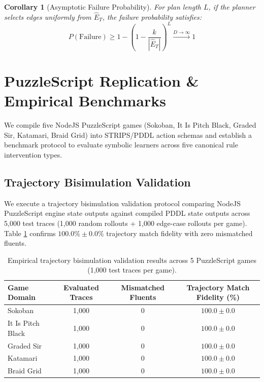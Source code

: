 \documentclass[preprint,12pt,3p]{elsarticle}
\newtheorem{corollary}{Corollary}
\begin{document}
\begin{corollary}[Asymptotic Failure Probability]
For plan length $L$, if the planner selects edges uniformly from $\hat{E}_T$, the failure probability satisfies:
\begin{equation}
P(\text{Failure}) \ge 1 - \left(1 - \frac{k}{|\hat{E}_T|}\right)^L \xrightarrow{D \to \infty} 1
\end{equation}
\end{corollary}

\section{PuzzleScript Replication \& Empirical Benchmarks}

We compile five NodeJS PuzzleScript games (Sokoban, It Is Pitch Black, Graded Sir, Katamari, Braid Grid) into STRIPS/PDDL action schemas and establish a benchmark protocol to evaluate symbolic learners across five canonical rule intervention types.

\subsection{Trajectory Bisimulation Validation}
We execute a trajectory bisimulation validation protocol comparing NodeJS PuzzleScript engine state outputs against compiled PDDL state outputs across 5,000 test traces (1,000 random rollouts + 1,000 edge-case rollouts per game). Table \ref{tab:bisimulation} confirms $100.0\% \pm 0.0\%$ trajectory match fidelity with zero mismatched fluents.

\begin{table}[htbp]
\centering
\caption{Empirical trajectory bisimulation validation results across 5 PuzzleScript games (1,000 test traces per game).}
\label{tab:bisimulation}
\small
\begin{tabular}{lccc}
\toprule
\textbf{Game Domain} & \textbf{Evaluated Traces} & \textbf{Mismatched Fluents} & \textbf{Trajectory Match Fidelity (\%)} \\
\midrule
Sokoban & 1,000 & 0 & $100.0 \pm 0.0$ \\
It Is Pitch Black & 1,000 & 0 & $100.0 \pm 0.0$ \\
Graded Sir & 1,000 & 0 & $100.0 \pm 0.0$ \\
Katamari & 1,000 & 0 & $100.0 \pm 0.0$ \\
Braid Grid & 1,000 & 0 & $100.0 \pm 0.0$ \\
\bottomrule
\end{tabular}
\end{table}
\end{document}
